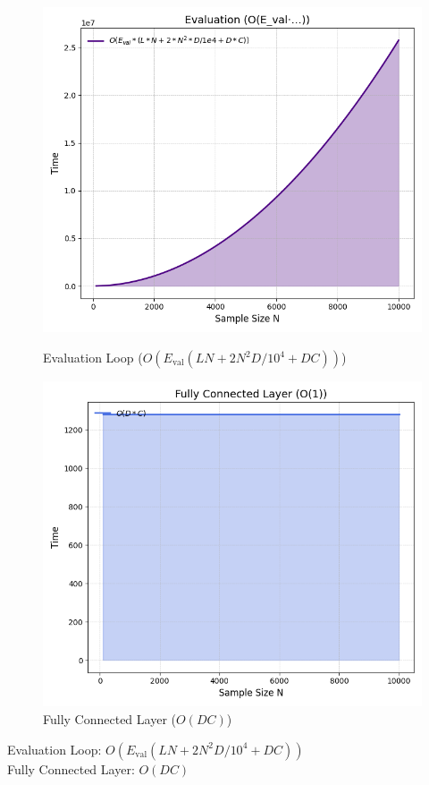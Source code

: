 \begin{figure}[H]
	\centering
	\begin{minipage}[b]{0.40\linewidth}
		\centering
		\includegraphics[width=\linewidth]{img/paper_3/evaluation_oe_val·…}
		\caption{Evaluation Loop (\(O(E_{\text{val}}(LN + 2N^2D/10^4 + DC))\))}
		\label{fig:evaluationoeval}
	\end{minipage}
	\hfill
	\begin{minipage}[b]{0.40\linewidth}
		\centering
		\includegraphics[width=\linewidth]{img/paper_3/fully_connected_layer_o1}
		\caption{Fully Connected Layer (\(O(DC)\))}
		\label{fig:fullyconnectedlayero1}
	\end{minipage}
\end{figure}

\noindent Evaluation Loop: \(O(E_{\text{val}}(LN + 2N^2D/10^4 + DC))\) \\
Fully Connected Layer: \(O(DC)\)
